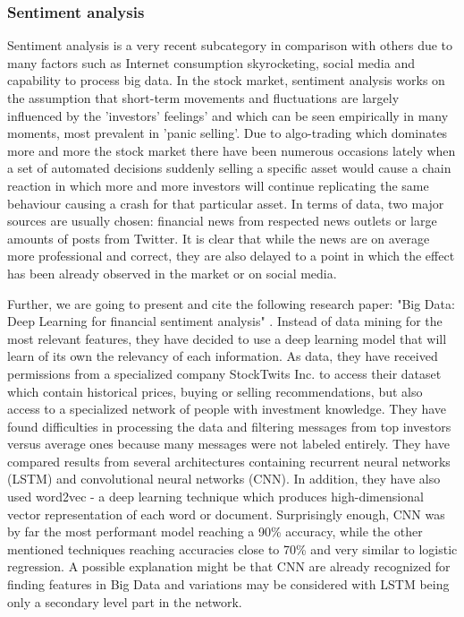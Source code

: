 \subsubsection{Sentiment analysis}

Sentiment analysis is a very recent subcategory in comparison with others due to many factors such as Internet consumption skyrocketing, social media and capability to process big data. In the stock market, sentiment analysis works on the assumption that short-term movements and fluctuations are largely influenced by the 'investors' feelings' and which can be seen empirically in many moments, most prevalent in 'panic selling'. Due to algo-trading which dominates more and more the stock market there have been numerous occasions lately when a set of automated decisions suddenly selling a specific asset would cause a chain reaction in which more and more investors will continue replicating the same behaviour causing a crash for that particular asset. In terms of data, two major sources are usually chosen: financial news from respected news outlets or large amounts of posts from Twitter. It is clear that while the news are on average more professional and correct, they are also delayed to a point in which the effect has been already observed in the market or on social media.

Further, we are going to present and cite the following research paper: "Big Data: Deep Learning for financial sentiment analysis" \cite{sohangir2018big}. Instead of data mining for the most relevant features, they have decided to use a deep learning model that will learn of its own the relevancy of each information. As data, they have received permissions from a specialized company StockTwits Inc. to access their dataset which contain historical prices, buying or selling recommendations, but also access to a specialized network of people with investment knowledge. They have found difficulties in processing the data and filtering messages from top investors versus average ones because many messages were not labeled entirely. They have compared results from several architectures containing recurrent neural networks (LSTM) and convolutional neural networks (CNN). In addition, they have also used word2vec - a deep learning technique which produces high-dimensional vector representation of each word or document. Surprisingly enough, CNN was by far the most performant model reaching a 90\% accuracy, while the other mentioned techniques reaching accuracies close to 70\% and very similar to logistic regression. A possible explanation might be that CNN are already recognized for finding features in Big Data and variations may be considered with LSTM being only a secondary level part in the network.

